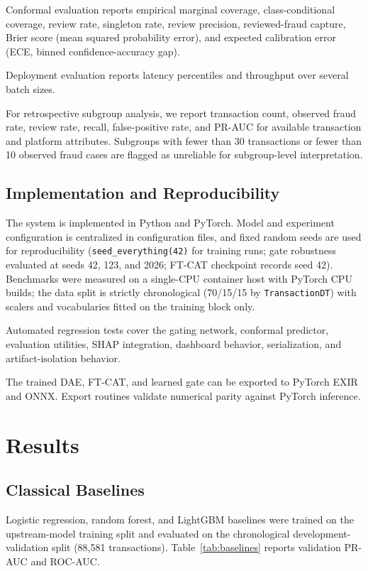 \documentclass[conference]{IEEEtran}
\begin{document}
Conformal evaluation reports empirical marginal coverage, class-conditional
coverage, review rate, singleton rate, review precision, reviewed-fraud capture,
Brier score (mean squared probability error), and expected calibration error
(ECE, binned confidence-accuracy gap).

Deployment evaluation reports latency percentiles and throughput over several
batch sizes.

For retrospective subgroup analysis, we report transaction count, observed
fraud rate, review rate, recall, false-positive rate, and PR-AUC for available
transaction and platform attributes. Subgroups with fewer than 30 transactions
or fewer than 10 observed fraud cases are flagged as unreliable for
subgroup-level interpretation.

\subsection{Implementation and Reproducibility}

The system is implemented in Python and PyTorch. Model and experiment
configuration is centralized in configuration files, and fixed random seeds are
used for reproducibility (\texttt{seed\_everything(42)} for training runs;
gate robustness evaluated at seeds 42, 123, and 2026; FT-CAT checkpoint records
seed 42). Benchmarks were measured on a single-CPU container host
with PyTorch CPU builds; the data split is strictly chronological
(70/15/15 by \texttt{TransactionDT}) with scalers and vocabularies fitted on
the training block only.

Automated regression tests cover the gating network, conformal predictor,
evaluation utilities, SHAP integration, dashboard behavior, serialization, and
artifact-isolation behavior.

The trained DAE, FT-CAT, and learned gate can be exported to PyTorch EXIR and
ONNX. Export routines validate numerical parity against PyTorch inference.

\section{Results}
\label{sec:results}

\subsection{Classical Baselines}

Logistic regression, random forest, and LightGBM baselines were trained on
the upstream-model training split and evaluated on the chronological
development-validation split (88{,}581 transactions).
Table~\ref{tab:baselines} reports validation PR-AUC and ROC-AUC.
\end{document}
